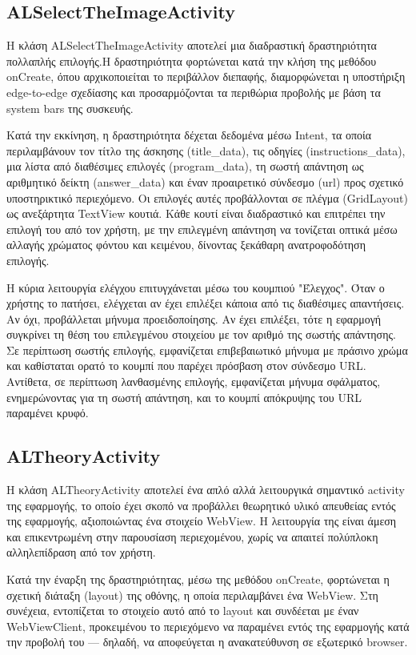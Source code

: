 \documentclass[11pt]{report}
\begin{document}
\subsection{ALSelectTheImageActivity}

Η κλάση ALSelectTheImageActivity αποτελεί μια διαδραστική δραστηριότητα πολλαπλής επιλογής.Η δραστηριότητα φορτώνεται κατά την κλήση της μεθόδου onCreate, όπου αρχικοποιείται το περιβάλλον διεπαφής, διαμορφώνεται η υποστήριξη edge-to-edge σχεδίασης και προσαρμόζονται τα περιθώρια προβολής με βάση τα system bars της συσκευής. 

Κατά την εκκίνηση, η δραστηριότητα δέχεται δεδομένα μέσω Intent, τα οποία περιλαμβάνουν τον τίτλο της άσκησης (title\_data), τις οδηγίες (instructions\_data), μια λίστα από διαθέσιμες επιλογές (program\_data), τη σωστή απάντηση ως αριθμητικό δείκτη (answer\_data) και έναν προαιρετικό σύνδεσμο (url) προς σχετικό υποστηρικτικό περιεχόμενο. Οι επιλογές αυτές προβάλλονται σε πλέγμα (GridLayout) ως ανεξάρτητα TextView κουτιά. Κάθε κουτί είναι διαδραστικό και επιτρέπει την επιλογή του από τον χρήστη, με την επιλεγμένη απάντηση να τονίζεται οπτικά μέσω αλλαγής χρώματος φόντου και κειμένου, δίνοντας ξεκάθαρη ανατροφοδότηση επιλογής. 

Η κύρια λειτουργία ελέγχου επιτυγχάνεται μέσω του κουμπιού "Έλεγχος". Όταν ο χρήστης το πατήσει, ελέγχεται αν έχει επιλέξει κάποια από τις διαθέσιμες απαντήσεις. Αν όχι, προβάλλεται μήνυμα προειδοποίησης. Αν έχει επιλέξει, τότε η εφαρμογή συγκρίνει τη θέση του επιλεγμένου στοιχείου με τον αριθμό της σωστής απάντησης. Σε περίπτωση σωστής επιλογής, εμφανίζεται επιβεβαιωτικό μήνυμα με πράσινο χρώμα και καθίσταται ορατό το κουμπί που παρέχει πρόσβαση στον σύνδεσμο URL. Αντίθετα, σε περίπτωση λανθασμένης επιλογής, εμφανίζεται μήνυμα σφάλματος, ενημερώνοντας για τη σωστή απάντηση, και το κουμπί απόκρυψης του URL παραμένει κρυφό. 

\subsection{ALTheoryActivity}

Η κλάση ALTheoryActivity αποτελεί ένα απλό αλλά λειτουργικά σημαντικό activity της εφαρμογής, το οποίο έχει σκοπό να προβάλλει θεωρητικό υλικό απευθείας εντός της εφαρμογής, αξιοποιώντας ένα στοιχείο WebView. Η λειτουργία της είναι άμεση και επικεντρωμένη στην παρουσίαση περιεχομένου, χωρίς να απαιτεί πολύπλοκη αλληλεπίδραση από τον χρήστη. 

Κατά την έναρξη της δραστηριότητας, μέσω της μεθόδου onCreate, φορτώνεται η σχετική διάταξη (layout) της οθόνης, η οποία περιλαμβάνει ένα WebView. Στη συνέχεια, εντοπίζεται το στοιχείο αυτό από το layout και συνδέεται με έναν WebViewClient, προκειμένου το περιεχόμενο να παραμένει εντός της εφαρμογής κατά την προβολή του — δηλαδή, να αποφεύγεται η ανακατεύθυνση σε εξωτερικό browser. 
\end{document}
